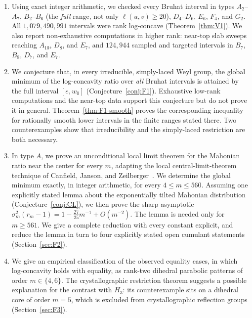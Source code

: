 \documentclass[11pt]{amsart}
\theoremstyle{plain}
\theoremstyle{definition}
\theoremstyle{remark}
\begin{document}
\begin{enumerate}[label=(\roman*)]
\item Using exact integer arithmetic, we checked every Bruhat interval in
types $A_2$--$A_7$, $B_2$--$B_6$ (the \emph{full} range, not only
$\ell(u,v)\ge 20$), $D_4$--$D_6$, $E_6$, $F_4$, and $G_2$. All
$1{,}079{,}490{,}991$ intervals were rank log-concave
(Theorem~\ref{thm:V1}). We also report non-exhaustive computations in
higher rank: near-top slab sweeps reaching $A_{10}$, $D_8$, and $E_7$, and
$124{,}944$ sampled and targeted intervals in $B_7$, $B_8$, $D_7$, and
$E_7$.

\item We conjecture that, in every irreducible, simply-laced Weyl group,
the global minimum of the log-concavity ratio over \emph{all} Bruhat
intervals is attained by the full interval $[e,w_0]$
(Conjecture~\ref{conj:F1}). Exhaustive low-rank computations and the
near-top data support this conjecture but do not prove it in general.
Theorem~\ref{thm:F1-smooth} proves the corresponding inequality for
rationally smooth lower intervals in the finite ranges stated there. Two
counterexamples show that irreducibility and the simply-laced restriction
are both necessary.

\item In type $A$, we prove an unconditional local limit theorem for the
Mahonian ratio near the center for every $m$, adapting the local
central-limit-theorem technique of Canfield, Janson, and
Zeilberger~\cite{cjz2011}. We determine the global minimum exactly, in
integer arithmetic, for every $4\le m\le560$. Assuming one explicitly
stated lemma about the exponentially tilted Mahonian distribution
(Conjecture~\ref{conj:CL}), we then prove the sharp asymptotic
$\sigma_m^2(r_m-1)=1-\tfrac{27}{25}m^{-1}+O(m^{-2})$. The lemma is needed
only for $m\ge561$. We give a complete reduction with every constant
explicit, and reduce the lemma in turn to four explicitly stated open
cumulant statements (Section~\ref{sec:F2}).

\item We give an empirical classification of the observed equality cases,
in which log-concavity holds with equality, as rank-two dihedral parabolic
patterns of order $m\in\{4,6\}$. The crystallographic restriction theorem
suggests a possible explanation for the contrast with $H_3$: its
counterexample sits on a dihedral core of order $m=5$, which is excluded
from crystallographic reflection groups (Section~\ref{sec:F3}).
\end{enumerate}
\end{document}
